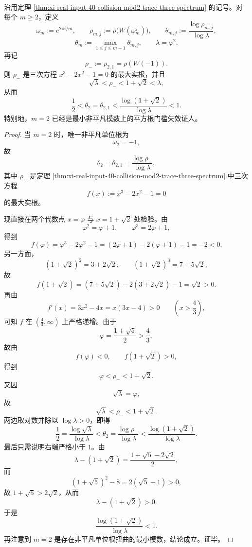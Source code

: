 \begin{theorem}\label{thm:xi-real-input-40-collision-minimal-modulus-two-witness}
沿用定理 \ref{thm:xi-real-input-40-collision-mod2-trace-three-spectrum} 的记号。对每个 \(m\ge 2\)，定义
\[
\omega_m:=e^{2\pi i/m},
\qquad
\rho_{m,j}:=\rho\!\bigl(W(\omega_m^j)\bigr),
\qquad
\theta_{m,j}:=\frac{\log \rho_{m,j}}{\log\lambda},
\]
\[
\theta_m:=\max_{1\le j\le m-1}\theta_{m,j},
\qquad
\lambda=\varphi^2.
\]
再记
\[
\rho_-:=\rho_{2,1}=\rho(W(-1)).
\]
则 \(\rho_-\) 是三次方程 \(x^3-2x^2-1=0\) 的最大实根，并且
\[
\sqrt{\lambda}<\rho_-<1+\sqrt2<\lambda,
\]
从而
\[
\boxed{\;
\frac12
<
\theta_2=\theta_{2,1}
<
\frac{\log(1+\sqrt2)}{\log\lambda}
<
1.\;}
\]
特别地，\(m=2\) 已经是最小非平凡模数上的平方根门槛失效证人。
\end{theorem}
\begin{proof}
当 \(m=2\) 时，唯一非平凡单位根为
\[
\omega_2=-1,
\]
故
\[
\theta_2=\theta_{2,1}=\frac{\log\rho_-}{\log\lambda},
\]
其中 \(\rho_-\) 是定理 \ref{thm:xi-real-input-40-collision-mod2-trace-three-spectrum} 中三次方程
\[
f(x):=x^3-2x^2-1=0
\]
的最大实根。

现直接在两个代数点 \(x=\varphi\) 与 \(x=1+\sqrt2\) 处检验。由
\[
\varphi^2=\varphi+1,
\qquad
\varphi^3=2\varphi+1,
\]
得到
\[
f(\varphi)
=
\varphi^3-2\varphi^2-1
=
(2\varphi+1)-2(\varphi+1)-1
=
-2<0.
\]
另一方面，
\[
(1+\sqrt2)^2=3+2\sqrt2,
\qquad
(1+\sqrt2)^3=7+5\sqrt2,
\]
故
\[
f(1+\sqrt2)
=(7+5\sqrt2)-2(3+2\sqrt2)-1
=\sqrt2>0.
\]
再由
\[
f'(x)=3x^2-4x=x(3x-4)>0
\qquad \left(x>\frac43\right),
\]
可知 \(f\) 在 \((\frac43,\infty)\) 上严格递增。由于
\[
\varphi=\frac{1+\sqrt5}{2}>\frac43,
\]
故由
\[
f(\varphi)<0,
\qquad
f(1+\sqrt2)>0,
\]
得到
\[
\varphi<\rho_-<1+\sqrt2.
\]
又因
\[
\sqrt{\lambda}=\varphi,
\]
故
\[
\sqrt{\lambda}<\rho_-<1+\sqrt2.
\]
两边取对数并除以 \(\log\lambda>0\)，即得
\[
 \frac12
 =
 \frac{\log\sqrt{\lambda}}{\log\lambda}
 <
 \theta_2
 =
 \frac{\log\rho_-}{\log\lambda}
<
\frac{\log(1+\sqrt2)}{\log\lambda}.
\]
最后只需说明右端严格小于 \(1\)。由
\[
\lambda-(1+\sqrt2)=\frac{1+\sqrt5-2\sqrt2}{2},
\]
而
\[
(1+\sqrt5)^2-8=2(\sqrt5-1)>0,
\]
故 \(1+\sqrt5>2\sqrt2\)，从而
\[
\lambda-(1+\sqrt2)>0.
\]
于是
\[
\frac{\log(1+\sqrt2)}{\log\lambda}<1.
\]
再注意到 \(m=2\) 是存在非平凡单位根扭曲的最小模数，结论成立。证毕。
\end{proof}

